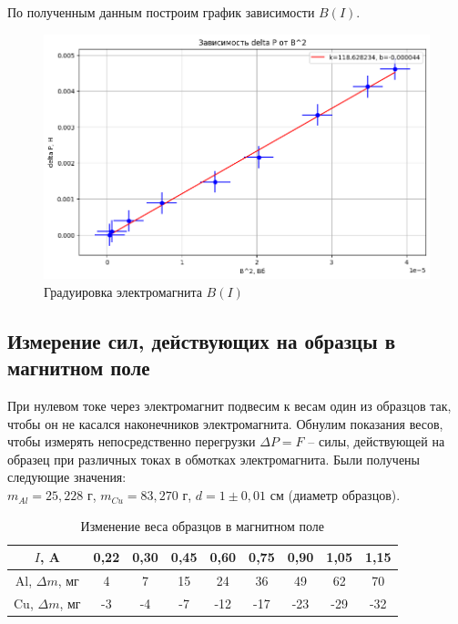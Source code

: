 \documentclass[a4paper, 12pt]{article}
\begin{document}
	По полученным данным построим график зависимости $ B(I)$.
	
	\begin{figure}[h!]
		\centering
		\includegraphics[width = \textwidth]{data/data1.png}
		\caption{Градуировка электромагнита $B(I)$}
	\end{figure}
	
	\subsection*{Измерение сил, действующих на образцы в магнитном поле}
	
	При нулевом токе через электромагнит подвесим к весам один из образцов так, чтобы он не касался наконечников электромагнита. Обнулим показания весов, чтобы измерять непосредственно перегрузки $ \Delta P = F $ -- силы, действующей на образец при различных токах в обмотках электромагнита. Были получены следующие значения:\\
	$m_{Al} = 25,228$ г, $m_{Cu} = 83,270$ г, $d = 1 \pm 0,01$ см (диаметр образцов). 
	\begin{table}[h!]
		\centering
		\begin{tabular}{|c|c|c|c|c|c|c|c|c|}
			\hline
			$I$, A & 0,22 & 0,30 & 0,45 & 0,60 & 0,75 & 0,90 & 1,05 & 1,15 \\ \hline
			Al, $\Delta m$, мг & 4 & 7 & 15 & 24 & 36 & 49 & 62 & 70 \\ \hline
			Cu, $\Delta m$, мг & -3 & -4 & -7 & -12 & -17 & -23 & -29 & -32 \\ \hline
		\end{tabular}
		\caption{Изменение веса образцов в магнитном поле}
	\end{table}
	
\end{document}
